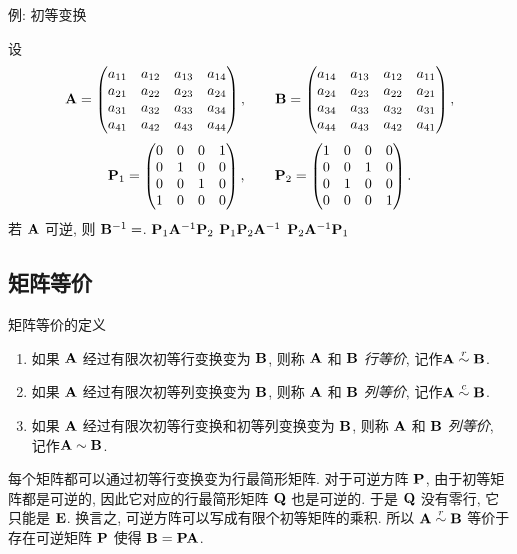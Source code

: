 \begin{frame}{例: 初等变换}
	\onslide<+->
	\begin{exercise}
		设\[{\mathbf{A}}=\begin{pmatrix}
			a_{11}&a_{12}&a_{13}&a_{14}\\
			a_{21}&a_{22}&a_{23}&a_{24}\\
			a_{31}&a_{32}&a_{33}&a_{34}\\
			a_{41}&a_{42}&a_{43}&a_{44}
	\end{pmatrix},\qquad{\mathbf{B}}=\begin{pmatrix}
		a_{14}&a_{13}&a_{12}&a_{11}\\
		a_{24}&a_{23}&a_{22}&a_{21}\\
		a_{34}&a_{33}&a_{32}&a_{31}\\
		a_{44}&a_{43}&a_{42}&a_{41}
	\end{pmatrix},\]\[{\mathbf{P}}_1=\begin{pmatrix}
		0&0&0&1\\
		0&1&0&0\\
		0&0&1&0\\
		1&0&0&0
	\end{pmatrix},\qquad{\mathbf{P}}_2=\begin{pmatrix}
		1&0&0&0\\
		0&0&1&0\\
		0&1&0&0\\
		0&0&0&1
	\end{pmatrix}.\]
	若 ${\mathbf{A}}$ 可逆, 则 ${\mathbf{B}}^{-1}=$.
	{${\mathbf{P}}_1{\mathbf{A}}^{-1}{\mathbf{P}}_2$}%
	{${\mathbf{P}}_1{\mathbf{P}}_2{\mathbf{A}}^{-1}$}%
	{${\mathbf{P}}_2{\mathbf{A}}^{-1}{\mathbf{P}}_1$}
	\end{exercise}
\end{frame}


\subsection{矩阵等价}

\begin{frame}{矩阵等价的定义}
	\onslide<+->
	\begin{definition}
		\begin{enumerate}
			\item 如果 ${\mathbf{A}}$ 经过有限次初等行变换变为 ${\mathbf{B}}$, 则称 ${\mathbf{A}}$ 和 ${\mathbf{B}}$ \emph{行等价}, 记作\emph{${\mathbf{A}}\mathrel{\overset{r}{\sim}}{\mathbf{B}}$}.
			\item 如果 ${\mathbf{A}}$ 经过有限次初等列变换变为 ${\mathbf{B}}$, 则称 ${\mathbf{A}}$ 和 ${\mathbf{B}}$ \emph{列等价}, 记作\emph{${\mathbf{A}}\mathrel{\overset{c}{\sim}}{\mathbf{B}}$}.
			\item 如果 ${\mathbf{A}}$ 经过有限次初等行变换和初等列变换变为 ${\mathbf{B}}$, 则称 ${\mathbf{A}}$ 和 ${\mathbf{B}}$ \emph{列等价}, 记作\emph{${\mathbf{A}}\sim{\mathbf{B}}$}.
		\end{enumerate}
	\end{definition}
	\onslide<+->
	每个矩阵都可以通过初等行变换变为行最简形矩阵.
	\onslide<+->
	对于可逆方阵 ${\mathbf{P}}$, 由于初等矩阵都是可逆的, 因此它对应的行最简形矩阵 ${\mathbf{Q}}$ 也是可逆的.
	\onslide<+->
	于是 ${\mathbf{Q}}$ 没有零行, 它只能是 ${\mathbf{E}}$.
	\onslide<+->
	换言之, \alert{可逆方阵可以写成有限个初等矩阵的乘积}.
	\onslide<+->
	所以 ${\mathbf{A}}\mathrel{\overset{r}{\sim}}{\mathbf{B}}$ 等价于存在可逆矩阵 ${\mathbf{P}}$ 使得 ${\mathbf{B}}={\mathbf{P}}{\mathbf{A}}$.
\end{frame}


